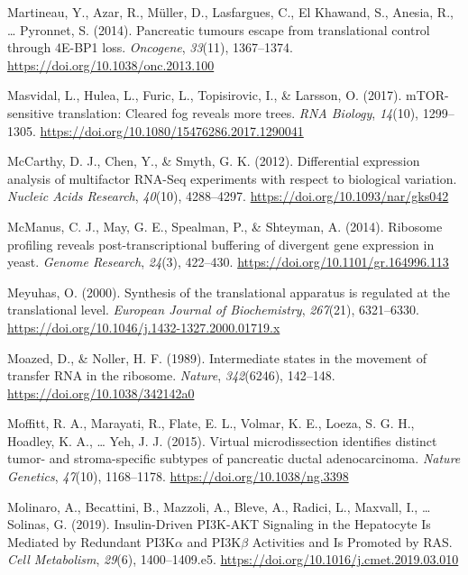 \documentclass[12pt,openany]{book}
\begin{document}
\hypertarget{ref-Martineau2014}{}
Martineau, Y., Azar, R., Müller, D., Lasfargues, C., El Khawand, S.,
Anesia, R., \ldots{} Pyronnet, S. (2014). Pancreatic tumours escape from
translational control through 4E-BP1 loss. \emph{Oncogene},
\emph{33}(11), 1367--1374. \url{https://doi.org/10.1038/onc.2013.100}

\hypertarget{ref-Masvidal2017}{}
Masvidal, L., Hulea, L., Furic, L., Topisirovic, I., \& Larsson, O.
(2017). mTOR-sensitive translation: Cleared fog reveals more trees.
\emph{RNA Biology}, \emph{14}(10), 1299--1305.
\url{https://doi.org/10.1080/15476286.2017.1290041}

\hypertarget{ref-McCarthy2012}{}
McCarthy, D. J., Chen, Y., \& Smyth, G. K. (2012). Differential
expression analysis of multifactor RNA-Seq experiments with respect to
biological variation. \emph{Nucleic Acids Research}, \emph{40}(10),
4288--4297. \url{https://doi.org/10.1093/nar/gks042}

\hypertarget{ref-McManus2014}{}
McManus, C. J., May, G. E., Spealman, P., \& Shteyman, A. (2014).
Ribosome profiling reveals post-transcriptional buffering of divergent
gene expression in yeast. \emph{Genome Research}, \emph{24}(3),
422--430. \url{https://doi.org/10.1101/gr.164996.113}

\hypertarget{ref-Meyuhas2000}{}
Meyuhas, O. (2000). Synthesis of the translational apparatus is
regulated at the translational level. \emph{European Journal of
Biochemistry}, \emph{267}(21), 6321--6330.
\url{https://doi.org/10.1046/j.1432-1327.2000.01719.x}

\hypertarget{ref-Moazed1989}{}
Moazed, D., \& Noller, H. F. (1989). Intermediate states in the movement
of transfer RNA in the ribosome. \emph{Nature}, \emph{342}(6246),
142--148. \url{https://doi.org/10.1038/342142a0}

\hypertarget{ref-Moffitt2015}{}
Moffitt, R. A., Marayati, R., Flate, E. L., Volmar, K. E., Loeza, S. G.
H., Hoadley, K. A., \ldots{} Yeh, J. J. (2015). Virtual microdissection
identifies distinct tumor- and stroma-specific subtypes of pancreatic
ductal adenocarcinoma. \emph{Nature Genetics}, \emph{47}(10),
1168--1178. \url{https://doi.org/10.1038/ng.3398}

\hypertarget{ref-Molinaro2019a}{}
Molinaro, A., Becattini, B., Mazzoli, A., Bleve, A., Radici, L.,
Maxvall, I., \ldots{} Solinas, G. (2019). Insulin-Driven PI3K-AKT
Signaling in the Hepatocyte Is Mediated by Redundant PI3K\(\alpha\) and
PI3K\(\beta\) Activities and Is Promoted by RAS. \emph{Cell Metabolism},
\emph{29}(6), 1400--1409.e5.
\url{https://doi.org/10.1016/j.cmet.2019.03.010}
\end{document}
